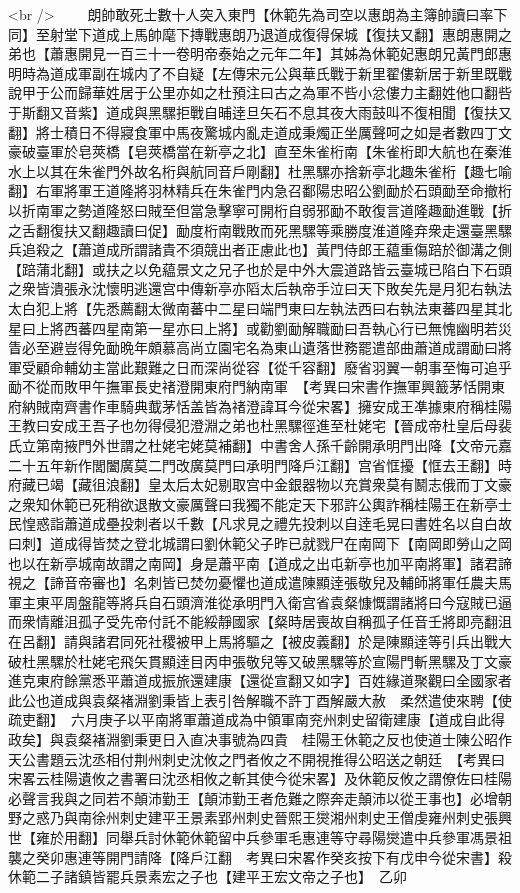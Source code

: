 <br />
　　朗帥敢死士數十人突入東門【休範先為司空以惠朗為主簿帥讀曰率下同】至射堂下道成上馬帥麾下摶戰惠朗乃退道成復得保城【復扶又翻】惠朗惠開之弟也【蕭惠開見一百三十一卷明帝泰始之元年二年】其姊為休範妃惠朗兄黃門郎惠明時為道成軍副在城内了不自疑【左傳宋元公與華氏戰于新里翟僂新居于新里既戰說甲于公而歸華姓居于公里亦如之杜預注曰古之為軍不呰小忿僂力主翻姓他口翻呰于斯翻又音紫】道成與黑騾拒戰自晡逹旦矢石不息其夜大雨鼓叫不復相聞【復扶又翻】將士積日不得寢食軍中馬夜驚城内亂走道成秉燭正坐厲聲呵之如是者數四丁文豪破臺軍於皂莢橋【皂莢橋當在新亭之北】直至朱雀桁南【朱雀桁即大航也在秦淮水上以其在朱雀門外故名桁與航同音戶剛翻】杜黑騾亦捨新亭北趣朱雀桁【趣七喻翻】右軍將軍王道隆將羽林精兵在朱雀門内急召鄱陽忠昭公劉勔於石頭勔至命撤桁以折南軍之勢道隆怒曰賊至但當急擊寧可開桁自弱邪勔不敢復言道隆趣勔進戰【折之舌翻復扶又翻趣讀曰促】勔度桁南戰敗而死黑騾等乘勝度淮道隆弃衆走還臺黑騾兵追殺之【蕭道成所謂諸貴不須競出者正慮此也】黃門侍郎王藴重傷踣於御溝之側【踣蒲北翻】或扶之以免藴景文之兄子也於是中外大震道路皆云臺城已陷白下石頭之衆皆潰張永沈懷明逃還宫中傳新亭亦䧟太后執帝手泣曰天下敗矣先是月犯右執法太白犯上將【先悉薦翻太微南蕃中二星曰端門東曰左執法西曰右執法東蕃四星其北星曰上將西蕃四星南第一星亦曰上將】或勸劉勔解職勔曰吾執心行已無愧幽明若災眚必至避豈得免勔晩年頗慕高尚立園宅名為東山遺落世務罷遣部曲蕭道成謂勔曰將軍受顧命輔幼主當此艱難之日而深尚從容【從千容翻】廢省羽翼一朝事至悔可追乎勔不從而敗甲午撫軍長史禇澄開東府門納南軍　【考異曰宋書作撫軍興籖茅恬開東府納賊南齊書作車騎典韯茅恬盖皆為禇澄諱耳今從宋畧】擁安成王凖據東府稱桂陽王教曰安成王吾子也勿得侵犯澄淵之弟也杜黑騾徑進至杜姥宅【晉成帝杜皇后母裴氏立第南掖門外世謂之杜姥宅姥莫補翻】中書舍人孫千齡開承明門出降【文帝元嘉二十五年新作閭闔廣莫二門改廣莫門曰承明門降戶江翻】宫省恇擾【恇去王翻】時府藏已竭【藏徂浪翻】皇太后太妃剔取宫中金銀器物以充賞衆莫有鬭志俄而丁文豪之衆知休範已死稍欲退散文豪厲聲曰我獨不能定天下邪許公輿詐稱桂陽王在新亭士民惶惑詣蕭道成壘投刺者以千數【凡求見之禮先投刺以自逹毛晃曰書姓名以自白故曰刺】道成得皆焚之登北城謂曰劉休範父子昨已就戮尸在南岡下【南岡即勞山之岡也以在新亭城南故謂之南岡】身是蕭平南【道成之出屯新亭也加平南將軍】諸君諦視之【諦音帝審也】名刺皆已焚勿憂懼也道成遣陳顯逹張敬兒及輔師將軍任農夫馬軍主東平周盤龍等將兵自石頭濟淮從承明門入衛宫省袁粲慷慨謂諸將曰今寇賊已逼而衆情離沮孤子受先帝付託不能綏靜國家【粲時居喪故自稱孤子任音壬將即亮翻沮在呂翻】請與諸君同死社稷被甲上馬將驅之【被皮義翻】於是陳顯逹等引兵出戰大破杜黑騾於杜姥宅飛矢貫顯逹目丙申張敬兒等又破黑騾等於宣陽門斬黑騾及丁文豪進克東府餘黨悉平蕭道成振旅還建康【還從宣翻又如字】百姓緣道聚觀曰全國家者此公也道成與袁粲褚淵劉秉皆上表引咎解職不許丁酉解嚴大赦　柔然遣使來聘【使疏吏翻】　六月庚子以平南將軍蕭道成為中領軍南兖州刺史留衛建康【道成自此得政矣】與袁粲褚淵劉秉更日入直决事號為四貴　桂陽王休範之反也使道士陳公昭作天公書題云沈丞相付荆州刺史沈攸之門者攸之不開視推得公昭送之朝廷　【考異曰宋畧云桂陽遺攸之書署曰沈丞相攸之斬其使今從宋畧】及休範反攸之謂僚佐曰桂陽必聲言我與之同若不顛沛勤王【顛沛勤王者危難之際奔走顛沛以從王事也】必增朝野之惑乃與南徐州刺史建平王景素郢州刺史晉熙王爕湘州刺史王僧虔雍州刺史張興世【雍於用翻】同舉兵討休範休範留中兵參軍毛惠連等守尋陽爕遣中兵參軍馮景祖襲之癸卯惠連等開門請降【降戶江翻　考異曰宋畧作癸亥按下有戊申今從宋書】殺休範二子諸鎮皆罷兵景素宏之子也【建平王宏文帝之子也】　乙卯